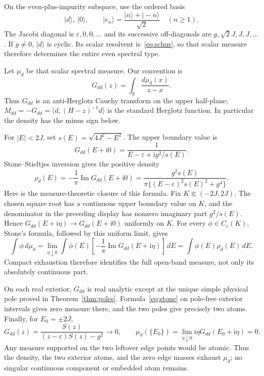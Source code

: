 \documentclass[9pt]{extarticle}
\newcommand{\ii}{\mathrm i}
\begin{document}
On the even-plus-impurity subspace, use the ordered basis
\[
 |d\rangle,\ |0\rangle,\qquad
 |e_n\rangle=\frac{|n\rangle+|-n\rangle}{\sqrt2}\quad(n\ge1).
\]
The Jacobi diagonal is $\varepsilon,0,0,\ldots$ and its successive
off-diagonals are $g,\sqrt2J,J,J,\ldots$.  If $g\ne0$, $|d\rangle$ is
cyclic.  Its scalar resolvent is~\eqref{eq:schur}, so that scalar measure
therefore determines the entire even spectral type.

Let $\mu_d$ be that scalar spectral measure.  Our convention is
\[
 G_{dd}(z)=\int_{\mathbb R}\frac{d\mu_d(x)}{z-x}.
\]
Thus $G_{dd}$ is an anti-Herglotz Cauchy transform on the upper half-plane;
$M_{dd}=-G_{dd}=\langle d,(H-z)^{-1}d\rangle$ is the standard Herglotz
function.  In particular the density has the minus sign below.

For $|E|<2J$, set $s(E)=\sqrt{4J^2-E^2}$.  The upper boundary value is
\[
 G_{dd}(E+\ii0)=\frac1{E-\varepsilon+\ii g^2/s(E)}.
\]
Stone--Stieltjes inversion gives the positive density
\begin{equation}\label{eq:density}
 \rho_d(E)=-\frac1\pi\operatorname{Im}G_{dd}(E+\ii0)
 =\frac{g^2s(E)}
 {\pi\{(E-\varepsilon)^2s(E)^2+g^4\}}.
\end{equation}
Here is the measure-theoretic closure of this formula.  Fix
$K\Subset(-2J,2J)$.  The chosen square root has a continuous upper boundary
value on $K$, and the denominator in the preceding display has nonzero
imaginary part $g^2/s(E)$.  Hence
$G_{dd}(E+\ii\eta)\to G_{dd}(E+\ii0)$ uniformly on $K$.  For every
$\phi\in C_c(K)$, Stone's formula, followed by this uniform limit, gives
\begin{equation}\label{eq:stone}
 \int\phi\,d\mu_d
 =\lim_{\eta\downarrow0}\int\phi(E)
   [-\frac1\pi\operatorname{Im}G_{dd}(E+\ii\eta)]\,dE
 =\int\phi(E)\rho_d(E)\,dE.
\end{equation}
Compact exhaustion therefore identifies the full open-band measure, not only
its absolutely continuous part.

On each real exterior, $G_{dd}$ is real analytic except at the unique simple
physical pole proved in Theorem~\ref{thm:poles}.  Formula~\eqref{eq:stone}
on pole-free exterior intervals gives zero measure there, and the two poles
give precisely two atoms.  Finally, for $E_0=\pm2J$,
\[
 G_{dd}(z)=\frac{S(z)}{(z-\varepsilon)S(z)-g^2}\longrightarrow0,
 \qquad
 \mu_d(\{E_0\})=\lim_{\eta\downarrow0}\ii\eta
 G_{dd}(E_0+\ii\eta)=0.
\]
Any measure supported on the two leftover edge points would be atomic.
Thus the density, the two exterior atoms, and the zero edge masses exhaust
$\mu_d$; no singular continuous component or embedded atom remains.
\end{document}
